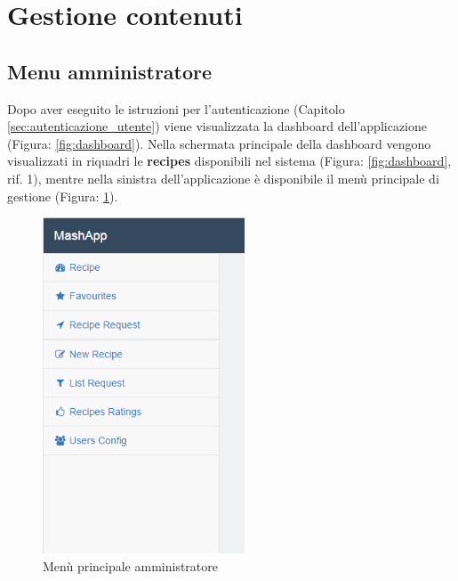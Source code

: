 %


\section{Gestione contenuti} %
\label{sec:gestione_contenuti}


	\subsection{Menu amministratore}
	\label{sec:menu_amministrazione}
		Dopo aver eseguito le istruzioni per l'autenticazione\gloss{} (Capitolo \ref{sec:autenticazione_utente}) viene visualizzata la dashboard\gloss{} dell’applicazione (Figura: \ref{fig:dashboard}).\newline
		Nella schermata principale della dashboard\gloss{} vengono visualizzati in riquadri le \textbf{recipes}\gloss{} disponibili nel sistema (Figura: \ref{fig:dashboard}, rif. 1), mentre nella sinistra dell'applicazione è disponibile il menù principale di gestione (Figura: \ref{fig:menu_principale_utente}).
		\begin{figure}[H]
			\centering
			\centerline{\includegraphics[width=6cm]{images/menu_principale_amministratore.png}}
			\caption{Menù principale amministratore}
			\label{fig:menu_principale_utente}
		\end{figure}


